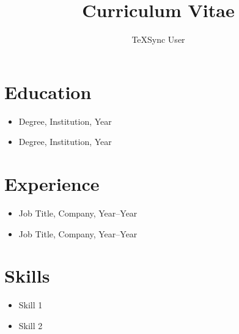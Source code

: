 \documentclass[11pt]{article}
\title{Curriculum Vitae}
\author{TeXSync User}
\date{}
\begin{document}
\maketitle

\section*{Education}
\begin{itemize}
  \item Degree, Institution, Year
  \item Degree, Institution, Year
\end{itemize}

\section*{Experience}
\begin{itemize}
  \item Job Title, Company, Year--Year
  \item Job Title, Company, Year--Year
\end{itemize}

\section*{Skills}
\begin{itemize}
  \item Skill 1
  \item Skill 2
\end{itemize}
\end{document}
